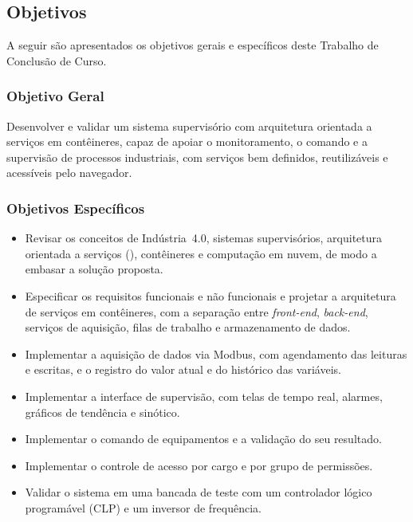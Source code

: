 \subsection{Objetivos}

\par A seguir são apresentados os objetivos gerais e específicos deste Trabalho de Conclusão de Curso.

\subsubsection{Objetivo Geral}

\par Desenvolver e validar um sistema supervisório com arquitetura orientada a serviços em contêineres, capaz de apoiar o monitoramento, o comando e a supervisão de processos industriais, com serviços bem definidos, reutilizáveis e acessíveis pelo navegador.

\subsubsection{Objetivos Específicos}

\begin{itemize}
    \item Revisar os conceitos de Indústria~4.0, sistemas supervisórios, arquitetura orientada a serviços (), contêineres e computação em nuvem, de modo a embasar a solução proposta.
    \item Especificar os requisitos funcionais e não funcionais e projetar a arquitetura de serviços em contêineres, com a separação entre \emph{front-end}, \emph{back-end}, serviços de aquisição, filas de trabalho e armazenamento de dados.
    \item Implementar a aquisição de dados via Modbus, com agendamento das leituras e escritas, e o registro do valor atual e do histórico das variáveis.
    \item Implementar a interface de supervisão, com telas de tempo real, alarmes, gráficos de tendência e sinótico.
    \item Implementar o comando de equipamentos e a validação do seu resultado.
    \item Implementar o controle de acesso por cargo e por grupo de permissões.
    \item Validar o sistema em uma bancada de teste com um controlador lógico programável (CLP) e um inversor de frequência.
\end{itemize}

